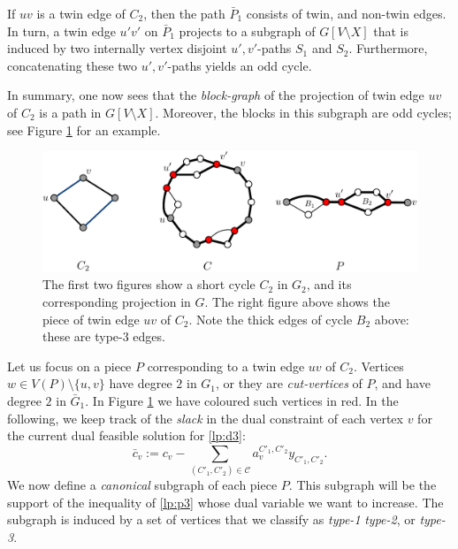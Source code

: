 \documentclass{article}
\newcommand{\C}{\ensuremath{\mathcal{C}}}
\newcommand{\0}{\mathbb{0}}
\newcommand{\1}{\mathbb{1}}
\begin{document}
If $uv$ is a twin edge of $C_2$, then the path $\bar{P}_1$ consists of twin, and non-twin
edges. In turn, a twin edge $u'v'$ on $\bar{P}_1$ projects to a
subgraph of $G[V \setminus X]$ that is induced by two internally vertex
disjoint $u',v'$-paths $S_1$ and $S_2$. Furthermore, concatenating these two
$u',v'$-paths yields an odd cycle. 

In summary, one now sees that
the {\em block-graph} of the projection of twin edge $uv$ of $C_2$ is 
a path in $G[V\setminus X]$. Moreover, the
blocks in this subgraph are odd cycles; see Figure \ref{fig:cycG2} for
an example.

\begin{figure}[b]
  \begin{center}
    \includegraphics[width=.8\textwidth]{cycG2.pdf}
  \end{center}
  \caption{\label{fig:cycG2}The first two figures show a  short cycle $C_2$ in $G_2$, and its
    corresponding projection in $G$. The right figure above shows the piece
    of twin edge $uv$ of $C_2$. Note the thick edges of cycle $B_2$ above: these
    are type-3 edges.}
\end{figure}

Let us focus on a piece $P$ corresponding to a twin edge $uv$ of
$C_2$. Vertices $w \in V(P)\setminus  \{u,v\}$ have degree $2$ in
$G_1$, or they are {\em cut-vertices} of $P$, and have degree $2$ in
$\bar{G}_1$. In Figure \ref{fig:cycG2} we have coloured such vertices
in red.
In the following, we keep track of the 
{\em slack} in the dual constraint of each vertex $v$ for the current dual feasible
solution for \eqref{lp:d3}:
\[ \bar{c}_v := c_v - \sum_{(C'_1,C'_2) \in \C} a^{C'_1,C'_2}_vy_{C'_1,C'_2}.\]
We now define a {\em canonical} subgraph of each piece $P$. 
This subgraph will be the support of the inequality of \eqref{lp:p3} whose dual variable
we want to increase. The subgraph is induced by a set of vertices 
that we classify as {\em type-1}  
{\em type-2}, or {\em type-3}.
\end{document}
